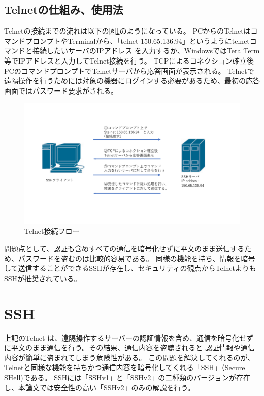 \documentclass[11pt,a4j,titlepage]{jreport}
\begin{document}
\subsection{Telnetの仕組み、使用法}
Telnetの接続までの流れは以下の図\ref{telnet_flow}のようになっている。
PCからのTelnetはコマンドプロンプトやTerminalから、「telnet 150.65.136.94」というようにtelnetコマンドと接続したいサーバのIPアドレス
を入力するか、WindowsではTera Term等でIPアドレスと入力してTelnet接続を行う。
TCPによるコネクション確立後PCのコマンドプロンプトでTelnetサーバから応答画面が表示される。
Telnetで遠隔操作を行うためには対象の機器にログインする必要があるため、最初の応答画面ではパスワード要求がされる。

\begin{figure}[H]
    \centering
    \includegraphics*[width=1.0\textwidth,page=1]{graphs/network_archtecture.pdf}
    \caption{Telnet接続フロー}
    \label{telnet_flow}
\end{figure}

問題点として、認証も含めすべての通信を暗号化せずに平文のまま送信するため、パスワードを盗むのは比較的容易である。
同様の機能を持ち、情報を暗号して送信することができるSSHが存在し、セキュリティの観点からTelnetよりもSSHが推奨されている。

\section{SSH}
上記のTelnet は、遠隔操作するサーバーの認証情報を含め、通信を暗号化せずに平文のまま通信を行う。その結果、通信内容を盗聴されると
認証情報や通信内容が簡単に盗まれてしまう危険性がある。
この問題を解決してくれるのが、Telnetと同様な機能を持ちかつ通信内容を暗号化してくれる「SSH」（Secure SHell)である。
SSHには「SSHv1」と「SSHv2」の二種類のバージョンが存在し、本論文では安全性の高い「SSHv2」のみの解説を行う。
\end{document}
